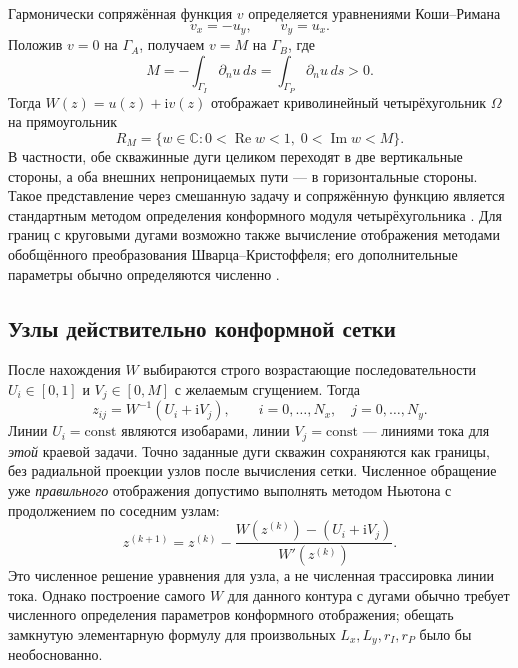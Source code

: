 \documentclass[12pt,a4paper]{article}
\begin{document}
Гармонически сопряжённая функция $v$ определяется уравнениями
Коши--Римана
\begin{equation}
 v_x=-u_y,\qquad v_y=u_x.
 \label{eq:cr}
\end{equation}
Положив $v=0$ на $\Gamma_A$, получаем $v=M$ на $\Gamma_B$, где
\begin{equation}
 M=-\int_{\Gamma_I}\partial_nu\,ds
  =\int_{\Gamma_P}\partial_nu\,ds>0.
 \label{eq:modulus}
\end{equation}
Тогда $W(z)=u(z)+\mathrm i v(z)$ отображает криволинейный
четырёхугольник $\Omega$ на прямоугольник
\begin{equation}
 R_M=\{w\in\mathbb C:0<\operatorname{Re}w<1,\;
                         0<\operatorname{Im}w<M\}.
 \label{eq:canonical-rectangle}
\end{equation}
В частности, обе скважинные дуги целиком переходят в две вертикальные
стороны, а оба внешних непроницаемых пути --- в горизонтальные стороны.
Такое представление через смешанную задачу и сопряжённую функцию является
стандартным методом определения конформного модуля четырёхугольника
\cite{conjugate-map}. Для границ с круговыми дугами возможно также
вычисление отображения методами обобщённого преобразования
Шварца--Кристоффеля; его дополнительные параметры обычно определяются
численно \cite{circular-arc-map}.

\subsection{Узлы действительно конформной сетки}

После нахождения $W$ выбираются строго возрастающие последовательности
$U_i\in[0,1]$ и $V_j\in[0,M]$ с желаемым сгущением. Тогда
\begin{equation}
 \boxed{\quad z_{ij}=W^{-1}(U_i+\mathrm i V_j),\qquad
 i=0,\ldots,N_x,\quad j=0,\ldots,N_y.\quad}
 \label{eq:conformal-nodes}
\end{equation}
Линии $U_i=\mathrm{const}$ являются изобарами, линии
$V_j=\mathrm{const}$ --- линиями тока для \emph{этой} краевой задачи.
Точно заданные дуги скважин сохраняются как границы, без радиальной
проекции узлов после вычисления сетки. Численное обращение уже
\emph{правильного} отображения допустимо выполнять методом Ньютона с
продолжением по соседним узлам:
\begin{equation}
 z^{(k+1)}=z^{(k)}-
 \frac{W(z^{(k)})-(U_i+\mathrm iV_j)}{W'(z^{(k)})}.
 \label{eq:inverse-map}
\end{equation}
Это численное решение уравнения для узла, а не численная трассировка
линии тока. Однако построение самого $W$ для данного контура с дугами
обычно требует численного определения параметров конформного отображения;
обещать замкнутую элементарную формулу для произвольных $L_x,L_y,r_I,r_P$
было бы необоснованно.
\end{document}

